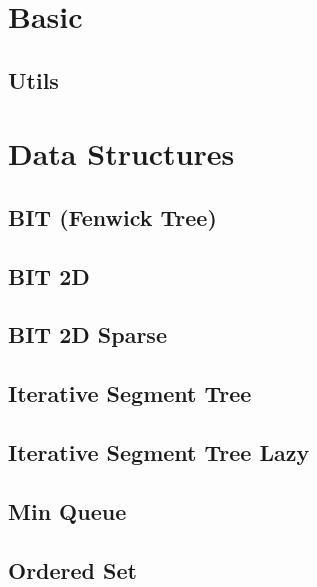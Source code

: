 \section{Basic}
\subsection{Utils}
\raggedbottom
\hrulefill

\section{Data Structures}
\subsection{BIT (Fenwick Tree)}
\raggedbottom
\hrulefill
\subsection{BIT 2D}
\raggedbottom
\hrulefill
\subsection{BIT 2D Sparse}
\raggedbottom
\hrulefill
\subsection{Iterative Segment Tree}
\raggedbottom
\hrulefill
\subsection{Iterative Segment Tree Lazy}
\raggedbottom
\hrulefill
\subsection{Min Queue}
\raggedbottom
\hrulefill
\subsection{Ordered Set}
\raggedbottom
\hrulefill
